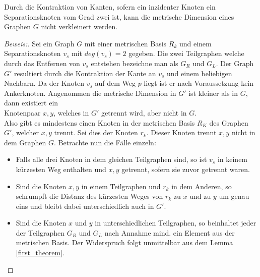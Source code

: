 \begin{lem}
\label{sepvertex2}
Durch die Kontraktion von Kanten, sofern ein inzidenter Knoten ein Separationsknoten vom Grad zwei ist, kann die metrische Dimension eines Graphen $G$ nicht verkleinert werden.
\end{lem}
\begin{proof}[Beweis:]
Sei ein Graph $G$ mit einer metrischen Basis $R_k$ und einem Separationsknoten $v_s$ mit $deg(v_s)=2$ gegeben. Die zwei Teilgraphen welche durch das Entfernen von $v_s$ entstehen bezeichne man als $G_R$ und $G_L$.
Der Graph $G'$ resultiert durch die Kontraktion der Kante an $v_s$ und einem beliebigen Nachbarn. Da der Knoten $v_s$ auf dem Weg $p$ liegt ist er nach Voraussetzung kein Ankerknoten.\newline
Angenommen die metrische Dimension in $G'$ ist kleiner als in $G$, dann existiert ein\\Knotenpaar $x,y$, welches in $G'$ getrennt wird, aber nicht in $G$.\\Also gibt es mindestens einen Knoten in der metrischen Basis $R_K$ des Graphen $G'$, welcher $x,y$ trennt. Sei dies der Knoten $r_k$. Dieser Knoten trennt $x,y$ nicht in dem Graphen $G$. 
Betrachte nun die Fälle einzeln:
\begin{itemize}
\item Falls alle drei Knoten in dem gleichen Teilgraphen sind, so ist $v_s$ in keinem kürzesten Weg enthalten und $x,y$ getrennt, sofern sie zuvor getrennt waren.
\item Sind die Knoten $x,y$ in einem Teilgraphen und $r_k$ in dem Anderen, so schrumpft die Distanz des kürzesten Weges von $r_k$ zu $x$ und zu $y$ um genau eins und bleibt dabei unterschiedlich auch in $G'$.
\item Sind die Knoten $x$ und $y$ in unterschiedlichen Teilgraphen, so beinhaltet jeder der Teilgraphen $G_R$ und $G_L$ nach Annahme mind. ein Element aus der metrischen Basis. Der Widerspruch folgt unmittelbar aus dem Lemma \ref{first_theorem}.
\vspace{-5mm}
\end{itemize}
\end{proof}
